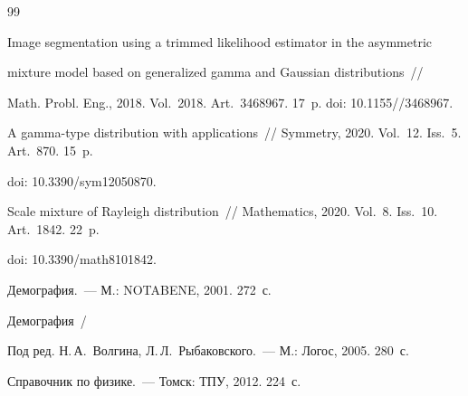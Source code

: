 {{\begin{thebibliography}{99}




Image segmentation using a trimmed likelihood estimator in the asymmetric 


mixture model based on generalized gamma and Gaussian distributions~/\!\!/ 


Math. Probl. Eng., 2018. Vol.~2018. Art.~3468967. 17~p. doi: 10.1155\!//3468967.












A gamma-type distribution with applications~/\!\!/ Symmetry, 2020. Vol.~12. Iss.~5. Art.~870. 15~p. 


doi: 10.3390\!/\!sym12050870.









Scale mixture of Rayleigh distribution~/\!\!/ Mathematics, 2020. Vol.~8. Iss.~10. Art.~1842. 22~p. 


doi: 10.3390\!/\!math8101842.









Демография.~--- М.: NOTABENE, 2001. 272~с.







 Демография~/ 


Под ред. Н.\,А.~Волгина, Л.\,Л.~Рыбаковского.~--- М.: Логос, 2005. 280~с.









Справочник по физике.~--- Томск: ТПУ, 2012. 224~с.






\end{thebibliography}}}

